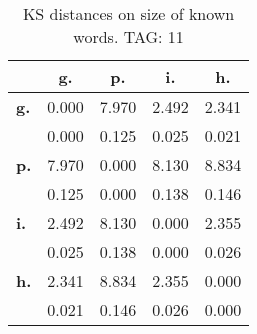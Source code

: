 \begin{table}[h!]
\begin{center}
\begin{tabular}{| l || c | c | c | c |}\hline
 & {\bf g.} & {\bf p.} & {\bf i.} & {\bf h.} \\\hline\hline
{\bf g.} & 0.000 & 7.970 & 2.492 & 2.341 \\
{\bf } & 0.000 & 0.125 & 0.025 & 0.021 \\\hline
{\bf p.} & 7.970 & 0.000 & 8.130 & 8.834 \\
{\bf } & 0.125 & 0.000 & 0.138 & 0.146 \\\hline
{\bf i.} & 2.492 & 8.130 & 0.000 & 2.355 \\
{\bf } & 0.025 & 0.138 & 0.000 & 0.026 \\\hline
{\bf h.} & 2.341 & 8.834 & 2.355 & 0.000 \\
{\bf } & 0.021 & 0.146 & 0.026 & 0.000 \\\hline
\end{tabular}
\caption{KS distances on size of known words. TAG: 11}
\end{center}
\end{table}
